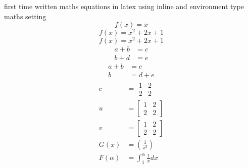 \documentclass{article}
\begin{document}
  first time written maths equations in latex
  using inline and environment type maths setting\\
  $$f(x)=x$$ %
  \begin{equation}
    f(x) = x^2+2x+1
  \end{equation}
  \begin{equation*}
    f(x) = x^2+2x+1
  \end{equation*}
  \begin{align*}
    a+b&=c\\
    b+d&=e
  \end{align*}
  \begin{align*}
    a+b&=c\\
    b&=d+e
  \end{align*}
  \begin{align*}
  c &= \begin{matrix}
    1&2\\
    2&2
  \end{matrix}\\
  u &=[
  \begin{matrix}
    1&2\\
    2&2
  \end{matrix}
  ]\\
  v&=\left[
  \begin{matrix}
    1&2\\
    2&2
  \end{matrix}
  \right]\\
  G(x)&=\left(\frac{1}{x^3}\right)\\
  F(\alpha) &= \int^\alpha_1\frac{1}{x}dx
  \end{align*}
\end{document}
